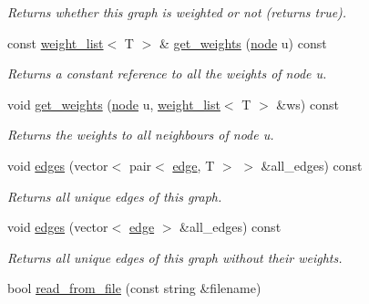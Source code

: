 \begin{DoxyCompactItemize}
\begin{DoxyCompactList}\small\item\em Returns whether this graph is weighted or not (returns true). \end{DoxyCompactList}\item 
const \hyperlink{namespacelgraph_1_1utils_a11e7963f3637ea13778b8d3e69d2c17f}{weight\+\_\+list}$<$ T $>$ \& \hyperlink{classlgraph_1_1utils_1_1wxgraph_a06252e99191d39329947c3a5eef43e73}{get\+\_\+weights} (\hyperlink{namespacelgraph_1_1utils_a7bd66ede3805ef121bc2835bd48de0cf}{node} u) const 
\begin{DoxyCompactList}\small\item\em Returns a constant reference to all the weights of node {\itshape u}. \end{DoxyCompactList}\item 
void \hyperlink{classlgraph_1_1utils_1_1wxgraph_a23c629eb031e31681749da793f933548}{get\+\_\+weights} (\hyperlink{namespacelgraph_1_1utils_a7bd66ede3805ef121bc2835bd48de0cf}{node} u, \hyperlink{namespacelgraph_1_1utils_a11e7963f3637ea13778b8d3e69d2c17f}{weight\+\_\+list}$<$ T $>$ \&ws) const 
\begin{DoxyCompactList}\small\item\em Returns the weights to all neighbours of node {\itshape u}. \end{DoxyCompactList}\item 
void \hyperlink{classlgraph_1_1utils_1_1wxgraph_a73b6c8887d5088750ee2cc98c45089c6}{edges} (vector$<$ pair$<$ \hyperlink{namespacelgraph_1_1utils_a6510284ce1b1ae5dc97ce5d2de426e10}{edge}, T $>$ $>$ \&all\+\_\+edges) const 
\begin{DoxyCompactList}\small\item\em Returns all unique edges of this graph. \end{DoxyCompactList}\item 
void \hyperlink{classlgraph_1_1utils_1_1wxgraph_a6c58b1f9bd596b3a12c181119eee9da2}{edges} (vector$<$ \hyperlink{namespacelgraph_1_1utils_a6510284ce1b1ae5dc97ce5d2de426e10}{edge} $>$ \&all\+\_\+edges) const 
\begin{DoxyCompactList}\small\item\em Returns all unique edges of this graph without their weights. \end{DoxyCompactList}\item 
bool \hyperlink{classlgraph_1_1utils_1_1wxgraph_a329e674f9e3543f3347343470d82d404}{read\+\_\+from\+\_\+file} (const string \&filename)\hypertarget{classlgraph_1_1utils_1_1wxgraph_a329e674f9e3543f3347343470d82d404}{}\label{classlgraph_1_1utils_1_1wxgraph_a329e674f9e3543f3347343470d82d404}


\end{DoxyCompactItemize}
